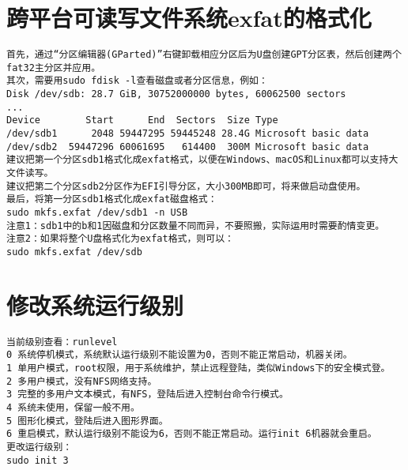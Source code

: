 \documentclass[a4paper,fontset=fandol,zihao=-4,linespread=1.2,oneside]{ctexbook}
\begin{document}
\section{跨平台可读写文件系统exfat的格式化}
\begin{lstlisting}
首先，通过“分区编辑器(GParted)”右键卸载相应分区后为U盘创建GPT分区表，然后创建两个fat32主分区并应用。
其次，需要用sudo fdisk -l查看磁盘或者分区信息，例如：
Disk /dev/sdb: 28.7 GiB, 30752000000 bytes, 60062500 sectors
...
Device        Start      End  Sectors  Size Type
/dev/sdb1      2048 59447295 59445248 28.4G Microsoft basic data
/dev/sdb2  59447296 60061695   614400  300M Microsoft basic data
建议把第一个分区sdb1格式化成exfat格式，以便在Windows、macOS和Linux都可以支持大文件读写。
建议把第二个分区sdb2分区作为EFI引导分区，大小300MB即可，将来做启动盘使用。
最后，将第一分区sdb1格式化成exfat磁盘格式：
sudo mkfs.exfat /dev/sdb1 -n USB
注意1：sdb1中的b和1因磁盘和分区数量不同而异，不要照搬，实际运用时需要酌情变更。
注意2：如果将整个U盘格式化为exfat格式，则可以：
sudo mkfs.exfat /dev/sdb
\end{lstlisting}

\section{修改系统运行级别}
\begin{lstlisting}
当前级别查看：runlevel
0 系统停机模式，系统默认运行级别不能设置为0，否则不能正常启动，机器关闭。
1 单用户模式，root权限，用于系统维护，禁止远程登陆，类似Windows下的安全模式登。
2 多用户模式，没有NFS网络支持。
3 完整的多用户文本模式，有NFS，登陆后进入控制台命令行模式。
4 系统未使用，保留一般不用。
5 图形化模式，登陆后进入图形界面。
6 重启模式，默认运行级别不能设为6，否则不能正常启动。运行init 6机器就会重启。
更改运行级别：
sudo init 3
\end{lstlisting}
\end{document}
